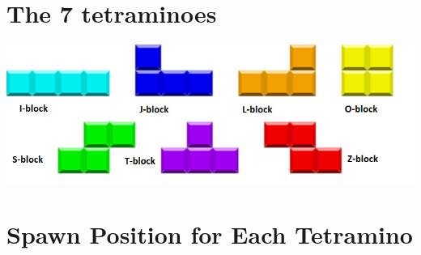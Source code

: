 \documentclass[a4paper]{article}
\begin{document}
\section{The 7 tetraminoes}

	\parbox[]{0.8\textwidth}{
	\centering
	\includegraphics[scale=0.5]{resources/img/tetraminoes}
	\label{tetraminoes}
	}

\section{Spawn Position for Each Tetramino}
\end{document}
